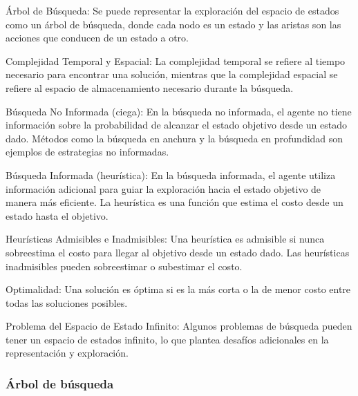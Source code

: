 \begin{myitemize}
    \item Árbol de Búsqueda: Se puede representar la exploración del espacio de estados
            como un árbol de búsqueda, donde cada nodo es un estado y las aristas son las
            acciones que conducen de un estado a otro.

    \item Complejidad Temporal y Espacial: La complejidad temporal se refiere al tiempo
            necesario para encontrar una solución, mientras que la complejidad espacial se
            refiere al espacio de almacenamiento necesario durante la búsqueda.

    \item Búsqueda No Informada (ciega): En la búsqueda no informada, el agente no tiene
            información sobre la probabilidad de alcanzar el estado objetivo desde un estado
            dado. Métodos como la búsqueda en anchura y la búsqueda en profundidad son
            ejemplos de estrategias no informadas.

    \item Búsqueda Informada (heurística): En la búsqueda informada, el agente utiliza
            información adicional para guiar la exploración hacia el estado objetivo de manera
            más eficiente. La heurística es una función que estima el costo desde un estado
            hasta el objetivo.            

    \item Heurísticas Admisibles e Inadmisibles: Una heurística es admisible si nunca
            sobreestima el costo para llegar al objetivo desde un estado dado. Las
            heurísticas inadmisibles pueden sobreestimar o subestimar el costo.

    \item Optimalidad: Una solución es óptima si es la más corta o la de menor costo
            entre todas las soluciones posibles.
            
    \item Problema del Espacio de Estado Infinito: Algunos problemas de búsqueda
            pueden tener un espacio de estados infinito, lo que plantea desafíos
            adicionales en la representación y exploración.
\end{myitemize}


\subsubsection*{Árbol de búsqueda}

